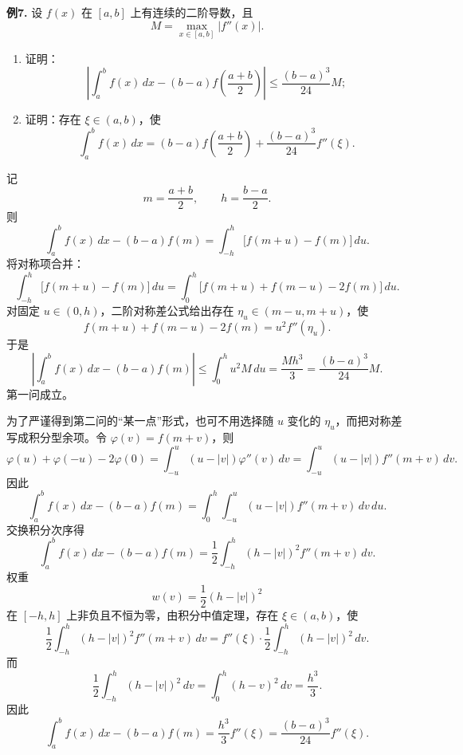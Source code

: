 \begin{problemblock}
\textbf{例7.} 设 \(f(x)\) 在 \([a,b]\) 上有连续的二阶导数，且
\[
M=\max_{x\in[a,b]}|f''(x)|.
\]
\begin{enumerate}[label=(\arabic*), leftmargin=2.2em]
\item 证明：
\[
\left|\int_a^b f(x)\,dx-(b-a)f\left(\frac{a+b}{2}\right)\right|
\le \frac{(b-a)^3}{24}M;
\]
\item 证明：存在 \(\xi\in(a,b)\)，使
\[
\int_a^b f(x)\,dx
=(b-a)f\left(\frac{a+b}{2}\right)
+\frac{(b-a)^3}{24}f''(\xi).
\]
\end{enumerate}
\end{problemblock}
\begin{solutionblock}
记
\[
m=\frac{a+b}{2},\qquad h=\frac{b-a}{2}.
\]
则
\[
\int_a^b f(x)\,dx-(b-a)f(m)
=\int_{-h}^{h}\bigl[f(m+u)-f(m)\bigr]\,du.
\]
将对称项合并：
\[
\int_{-h}^{h}\bigl[f(m+u)-f(m)\bigr]\,du
=\int_0^h\bigl[f(m+u)+f(m-u)-2f(m)\bigr]\,du.
\]
对固定 \(u\in(0,h)\)，二阶对称差公式给出存在 \(\eta_u\in(m-u,m+u)\)，使
\[
f(m+u)+f(m-u)-2f(m)=u^2 f''(\eta_u).
\]
于是
\[
\left|\int_a^b f(x)\,dx-(b-a)f(m)\right|
\le \int_0^h u^2 M\,du
=\frac{Mh^3}{3}
=\frac{(b-a)^3}{24}M.
\]
第一问成立。

为了严谨得到第二问的“某一点”形式，也可不用选择随 \(u\) 变化的 \(\eta_u\)，而把对称差写成积分型余项。令 \(\varphi(v)=f(m+v)\)，则
\[
\varphi(u)+\varphi(-u)-2\varphi(0)
=\int_{-u}^{u}(u-|v|)\varphi''(v)\,dv
=\int_{-u}^{u}(u-|v|)f''(m+v)\,dv .
\]
因此
\[
\int_a^b f(x)\,dx-(b-a)f(m)
=\int_0^h\int_{-u}^{u}(u-|v|)f''(m+v)\,dv\,du .
\]
交换积分次序得
\[
\int_a^b f(x)\,dx-(b-a)f(m)
=\frac12\int_{-h}^{h}(h-|v|)^2 f''(m+v)\,dv .
\]
权重
\[
w(v)=\frac12(h-|v|)^2
\]
在 \([-h,h]\) 上非负且不恒为零，由积分中值定理，存在 \(\xi\in(a,b)\)，使
\[
\frac12\int_{-h}^{h}(h-|v|)^2 f''(m+v)\,dv
=f''(\xi)\cdot \frac12\int_{-h}^{h}(h-|v|)^2\,dv.
\]
而
\[
\frac12\int_{-h}^{h}(h-|v|)^2\,dv
=\int_0^h (h-v)^2\,dv
=\frac{h^3}{3}.
\]
因此
\[
\int_a^b f(x)\,dx-(b-a)f(m)
=\frac{h^3}{3}f''(\xi)
=\frac{(b-a)^3}{24}f''(\xi).
\]
\end{solutionblock}

